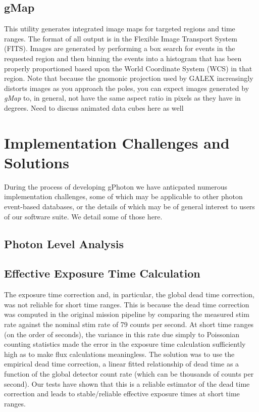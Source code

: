 \documentclass[preprint]{aastex}
\begin{document}
\subsection{gMap}
This utility generates integrated image maps for targeted regions and time ranges. The format of all output is in the Flexible Image Transport System (FITS). Images are generated by performing a box search for events in the requested region and then binning the events into a histogram that has been properly proportioned based upon the World Coordinate System (WCS) in that region. Note that because the gnomonic projection used by GALEX increasingly distorts images as you approach the poles, you can expect images generated by \textit{gMap} to, in general, not have the same aspect ratio in pixels as they have in degrees. {\color{red}Need to discuss animated data cubes here as well}

\section{Implementation Challenges and Solutions}
\label{implementation}
During the process of developing gPhoton we have anticpated numerous implementation challenges, some of which may be applicable to other photon event-based databases, or the details of which may be of general interest to users of our software suite.  We detail some of those here.

\subsection{Photon Level Analysis}

\subsection{Effective Exposure Time Calculation}
The exposure time correction and, in particular, the global dead time correction, was not reliable for short time ranges. This is because the dead time correction was computed in the original mission pipeline by comparing the measured stim rate against the nominal stim rate of 79 counts per second. At short time ranges (on the order of seconds), the variance in this rate due simply to Poissonian counting statistics made the error in the exposure time calculation sufficiently high as to make flux calculations meaningless. The solution was to use the empirical dead time correction, a linear fitted relationship of dead time as a function of the global detector count rate (which can be thousands of counts per second). Our tests have shown that this is a reliable estimator of the dead time correction and leads to stable/reliable effective exposure times at short time ranges.
\end{document}
